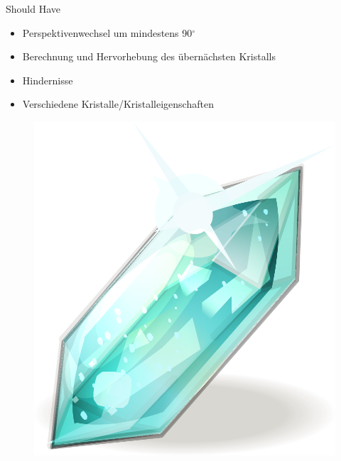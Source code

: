 \slideonetoone
{Should Have}
	{
		\begin{itemize}
			\item Perspektivenwechsel um mindestens 90$^\circ$
			\item Berechnung und Hervorhebung des übernächsten Kristalls
			\item Hindernisse
			\item Verschiedene Kristalle/Kristalleigenschaften
		\end{itemize}
		\begin{figure}
			\centering
			\includegraphics[width=\textwidth, height=0.35\textheight, keepaspectratio]{images/Resonanz-Kristall}
		\end{figure}
	}
